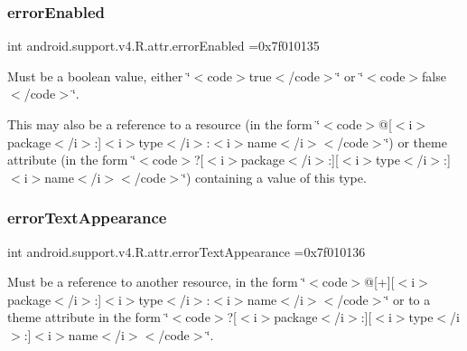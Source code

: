 \subsubsection{\texorpdfstring{error\+Enabled}{errorEnabled}}
{\footnotesize\ttfamily int android.\+support.\+v4.\+R.\+attr.\+error\+Enabled =0x7f010135\hspace{0.3cm}{\ttfamily [static]}}

Must be a boolean value, either \char`\"{}$<$code$>$true$<$/code$>$\char`\"{} or \char`\"{}$<$code$>$false$<$/code$>$\char`\"{}. 

This may also be a reference to a resource (in the form \char`\"{}$<$code$>$@\mbox{[}$<$i$>$package$<$/i$>$\+:\mbox{]}$<$i$>$type$<$/i$>$\+:$<$i$>$name$<$/i$>$$<$/code$>$\char`\"{}) or theme attribute (in the form \char`\"{}$<$code$>$?\mbox{[}$<$i$>$package$<$/i$>$\+:\mbox{]}\mbox{[}$<$i$>$type$<$/i$>$\+:\mbox{]}$<$i$>$name$<$/i$>$$<$/code$>$\char`\"{}) containing a value of this type. \mbox{\label{classandroid_1_1support_1_1v4_1_1R_1_1attr_a8af4dbdff7c093c06f9d39eb500ec3ec}} 
\subsubsection{\texorpdfstring{error\+Text\+Appearance}{errorTextAppearance}}
{\footnotesize\ttfamily int android.\+support.\+v4.\+R.\+attr.\+error\+Text\+Appearance =0x7f010136\hspace{0.3cm}{\ttfamily [static]}}

Must be a reference to another resource, in the form \char`\"{}$<$code$>$@\mbox{[}+\mbox{]}\mbox{[}$<$i$>$package$<$/i$>$\+:\mbox{]}$<$i$>$type$<$/i$>$\+:$<$i$>$name$<$/i$>$$<$/code$>$\char`\"{} or to a theme attribute in the form \char`\"{}$<$code$>$?\mbox{[}$<$i$>$package$<$/i$>$\+:\mbox{]}\mbox{[}$<$i$>$type$<$/i$>$\+:\mbox{]}$<$i$>$name$<$/i$>$$<$/code$>$\char`\"{}. \mbox{\label{classandroid_1_1support_1_1v4_1_1R_1_1attr_a6ce1e5650d7bdbaf6f02bb9f1c21ac55}} 
